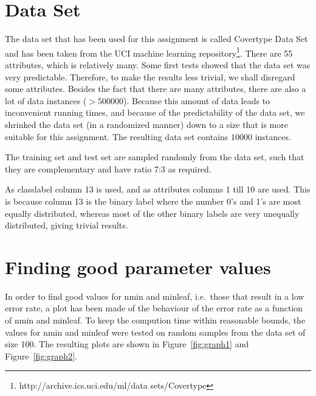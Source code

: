 \documentclass[12pt]{article}
\theoremstyle{definition}
\begin{document}
\maketitle

\section{Data Set}
\label{sec:dataset}

The data set that has been used for this assignment is called Covertype Data Set and has been
taken from the UCI machine learning
repository\footnote{http://archive.ics.uci.edu/ml/data sets/Covertype}.
There are 55 attributes, which is relatively many.
Some first tests showed that the data set was very predictable.
Therefore, to make the results less trivial, we shall disregard some attributes.
Besides the fact that there are many attributes, there are also a lot of data instances
($> 500 000$).
Because this amount of data leads to inconvenient running times, and because of the
predictability of the data set, we shrinked the data set (in a randomized manner)
down to a size that is more suitable for this assignment.
The resulting data set contains $10000$ instances.

The training set and test set are sampled randomly from the data set, such that
they are complementary and have ratio 7:3 as required.

As classlabel column 13 is used, and as attributes columns 1 till 10 are used.
This is because column 13 is the binary label where the number 0's and 1's are most
equally distributed, whereas most of the other binary labels are very unequally distributed,
giving trivial results.

\section{Finding good parameter values}
\label{sec:finding}

In order to find good values for nmin and minleaf, i.e.\ those that result in a low error rate,
a plot has been made of the behaviour of the error rate as a function of nmin and minleaf.
To keep the compution time within reasonable bounds, the values for nmin and minleaf were
tested on random samples from the data set of size 100.
The resulting plots are shown in Figure~\ref{fig:graph1} and Figure~\ref{fig:graph2}.
\end{document}
